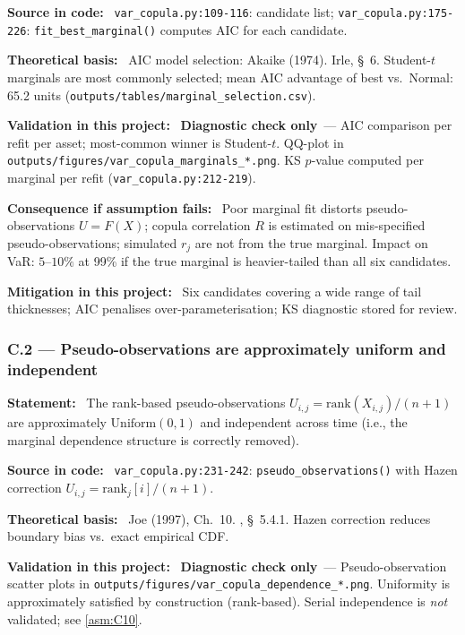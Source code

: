 \documentclass[11pt,a4paper]{article}
\newcommand{\asmfield}[1]{\medskip\noindent\textbf{#1:}\ }
\newcommand{\code}[1]{\texttt{#1}}
\newcommand{\diagnostic}{\textbf{Diagnostic check only}}
\begin{document}
\asmfield{Source in code}
\code{var\_copula.py:109-116}: candidate list; \code{var\_copula.py:175-226}:
\code{fit\_best\_marginal()} computes AIC for each candidate.

\asmfield{Theoretical basis}
AIC model selection: Akaike (1974). Irle, \S~6. Student-$t$ marginals are
most commonly selected; mean AIC advantage of best vs.\ Normal: 65.2 units
(\code{outputs/tables/marginal\_selection.csv}).

\asmfield{Validation in this project}
\diagnostic\ --- AIC comparison per refit per asset; most-common winner is
Student-$t$. QQ-plot in \code{outputs/figures/var\_copula\_marginals\_*.png}.
KS $p$-value computed per marginal per refit (\code{var\_copula.py:212-219}).

\asmfield{Consequence if assumption fails}
Poor marginal fit distorts pseudo-observations $U = F(X)$; copula
correlation $R$ is estimated on mis-specified pseudo-observations; simulated
$r_j$ are not from the true marginal. Impact on VaR: $5$--$10\%$ at 99\%
if the true marginal is heavier-tailed than all six candidates.

\asmfield{Mitigation in this project}
Six candidates covering a wide range of tail thicknesses; AIC penalises
over-parameterisation; KS diagnostic stored for review.

\subsubsection{C.2 --- Pseudo-observations are approximately uniform and independent}\label{asm:C2}

\asmfield{Statement}
The rank-based pseudo-observations $U_{i,j} = \text{rank}(X_{i,j}) / (n+1)$
are approximately $\text{Uniform}(0,1)$ and independent across time
(i.e., the marginal dependence structure is correctly removed).

\asmfield{Source in code}
\code{var\_copula.py:231-242}: \code{pseudo\_observations()} with Hazen
correction $U_{i,j} = \text{rank}_j[i] / (n+1)$.

\asmfield{Theoretical basis}
Joe (1997), Ch.~10. \cite{McNeilFreyEmbrechts2005}, \S~5.4.1. Hazen
correction reduces boundary bias vs.\ exact empirical CDF.

\asmfield{Validation in this project}
\diagnostic\ --- Pseudo-observation scatter plots in
\code{outputs/figures/var\_copula\_dependence\_*.png}. Uniformity is
approximately satisfied by construction (rank-based). Serial independence
is \emph{not} validated; see \cref{asm:C10}.
\end{document}
